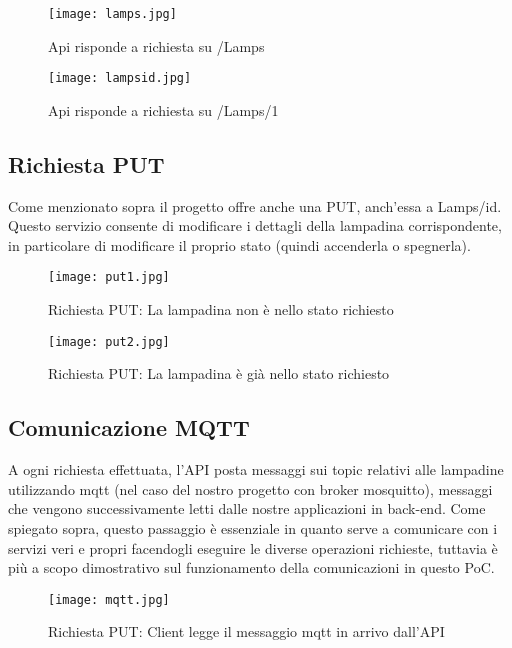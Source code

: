 \begin{figure}[H]
    \centering
    \texttt{[image: lamps.jpg]}
    \caption{Api risponde a richiesta su /Lamps}
\end{figure}

\begin{figure}[H]
    \centering
    \texttt{[image: lampsid.jpg]}
    \caption{Api risponde a richiesta su /Lamps/1}
\end{figure}

\subsection{Richiesta PUT}

Come menzionato sopra il progetto offre anche una PUT, anch'essa a Lamps/id. Questo servizio consente di modificare i dettagli della lampadina corrispondente, in particolare di modificare il proprio stato (quindi accenderla o spegnerla).

\begin{figure}[H]
    \centering
    \texttt{[image: put1.jpg]}
    \caption{Richiesta PUT: La lampadina non è nello stato richiesto}
\end{figure}

\begin{figure}[H]
    \centering
    \texttt{[image: put2.jpg]}
    \caption{Richiesta PUT: La lampadina è già nello stato richiesto}
\end{figure}

\subsection{Comunicazione MQTT}

A ogni richiesta effettuata, l'API posta messaggi sui topic relativi alle lampadine utilizzando mqtt (nel caso del nostro progetto con broker mosquitto), messaggi che vengono successivamente letti dalle nostre applicazioni in back-end. Come spiegato sopra, questo passaggio è essenziale in quanto serve a comunicare con i servizi veri e propri facendogli eseguire le diverse operazioni richieste, tuttavia è più a scopo dimostrativo sul funzionamento della comunicazioni in questo PoC.

\begin{figure}[H]
    \centering
    \texttt{[image: mqtt.jpg]}
    \caption{Richiesta PUT: Client legge il messaggio mqtt in arrivo dall'API}
\end{figure}